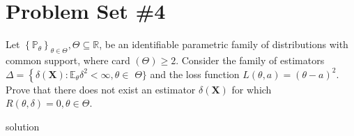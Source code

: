 \section{Problem Set \#4}

\begin{exercise}
    Let \(\left\{\mathbb{P}_{\theta}\right\}_{\theta \in \Theta}, \Theta \subseteq \mathbb{R}\), be an identifiable parametric family of distributions with common support, where card \((\Theta) \geq 2\). Consider the family of estimators \(\Delta=\left\{\delta(\mathbf{X}): \mathbb{E}_{\theta} \delta^{2}<\infty, \theta \in\right.\) \(\Theta\}\) and the loss function \(L(\theta, a)=(\theta-a)^{2}\). Prove that there does not exist an estimator \(\delta(\mathbf{X})\) for which \(R(\theta, \delta)=0, \theta \in \Theta\).
\end{exercise}

\begin{solution}
    solution
\end{solution}













